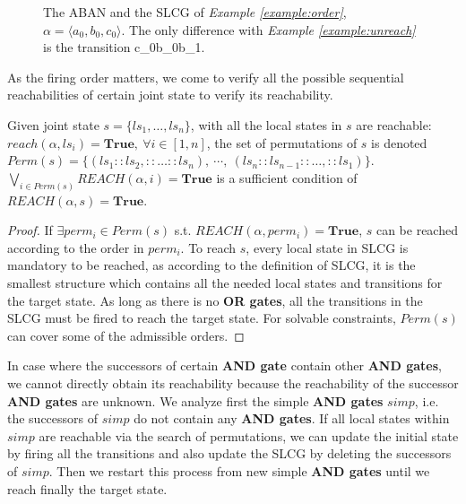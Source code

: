 \begin{figure}[ht]
\centering

\caption[Ordering in SLCG]{The ABAN and the SLCG of \textit{Example \ref{example:order}}, $\alpha=\langle a_0,b_0,c_0\rangle$. 
The only difference with \textit{Example \ref{example:unreach}} is the transition \ac{c_0}{b_0}{b_1}.
}
\label{fig:unreach}
\end{figure}

As the firing order matters, we come to verify all the possible sequential reachabilities of certain joint state to verify its reachability.

\begin{proposition}\label{theoperm}
Given joint state $s=\{ls_1,\ldots,ls_n\}$, with all the local states in $s$ are reachable: $reach(\alpha,ls_i)=\mathbf{True},\ \forall i\in[1,n]$, the set of permutations of $s$ is denoted $Perm(s)=\{(ls_1::ls_2,::\ldots ::ls_n),\ \cdots,\ (ls_n::ls_{n-1}::\ldots,::ls_1)\}$. $\bigvee_{i\in Perm(s)} REACH(\alpha,i)=\mathbf{True}$ is a sufficient condition of $REACH(\alpha,s)=\mathbf{True}$.
\end{proposition}

\begin{proof}
If $\exists perm_i\in Perm(s)$ s.t. $REACH(\alpha,perm_i)=\mathbf{True}$, $s$ can be reached according to the order in $perm_i$.
To reach $s$, every local state in SLCG is mandatory to be reached, as according to the definition of SLCG, it is the smallest structure which contains all the needed local states and transitions for the target state. As long as there is no \textbf{OR gates}, all the transitions in the SLCG must be fired to reach the target state.
For solvable constraints, $Perm(s)$ can cover some of the admissible orders.
\end{proof}

In case where the successors of certain \textbf{AND gate} contain other \textbf{AND gates}, we cannot directly obtain its reachability because the reachability of the successor \textbf{AND gates} are unknown.
We analyze first the simple \textbf{AND gates} $simp$, i.e. the successors of $simp$ do not contain any \textbf{AND gates}.
If all local states within $simp$ are reachable via the search of permutations, we can update the initial state by firing all the transitions and also update the SLCG by deleting the successors of $simp$. 
Then we restart this process from new simple \textbf{AND gates} until we reach finally the target state.


